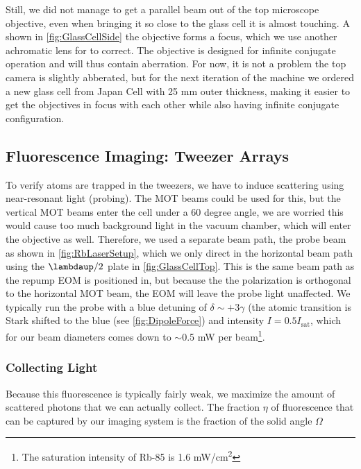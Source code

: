 Still, we did not manage to get a parallel beam out of the top microscope objective, even when bringing it so close to the glass cell it is almost touching. A shown in \cref{fig:GlassCellSide} the objective forms a focus, which we use another achromatic lens for to correct. 
The objective is designed for infinite conjugate operation and will thus contain aberration. 
For now, it is not a problem the top camera is slightly abberated, but for the next iteration of the machine we ordered a new glass cell from Japan Cell with 25 mm outer thickness, making it easier to get the objectives in focus with each other while also having infinite conjugate configuration.

\subsection{Fluorescence Imaging: Tweezer Arrays}


To verify atoms are trapped in the tweezers, we have to induce scattering using near-resonant light (probing). 
The MOT beams could be used for this, but the vertical MOT beams enter the cell under a 60 degree angle, we are worried this would cause too much background light in the vacuum chamber, which will enter the objective as well. 
Therefore, we used a separate beam path, the probe beam as shown in \cref{fig:RbLaserSetup}, which we only direct in the horizontal beam path using the $\lambdaup/2$ plate in \cref{fig:GlassCellTop}.
This is the same beam path as the repump EOM is positioned in, but because the the polarization is orthogonal to the horizontal MOT beam, the EOM will leave the probe light unaffected. 
We typically run the probe with a blue detuning of $\delta \sim +3\gamma$ (the atomic transition is Stark shifted to the blue (see \cref{fig:DipoleForce}) and intensity $I = 0.5 I_{\text{sat}}$, which for our beam diameters comes down to $\sim0.$5 mW per beam\footnote{The saturation intensity of Rb-85 is 1.6 mW/cm\textsuperscript{2}}. 

\subsubsection*{Collecting Light}

Because this fluorescence is typically fairly weak, we maximize the amount of scattered photons that we can actually collect. 
The fraction $\eta$ of fluorescence that can be captured by our imaging system is the fraction of the solid angle $\Omega$

